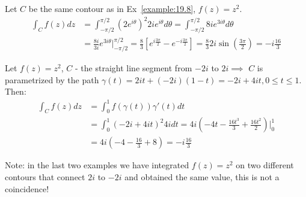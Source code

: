 \begin{example}\label{example:19.9} Let $C$ be the same contour as in Ex~\ref{example:19.8}, $f(z) = z^2$.
    \begin{align*}
 \int_C f(z) dz & = \int_{-\pi/2}^{\pi/2} (2e^{i\theta})^2 2ie^{i\theta} d\theta = \int_{-\pi/2}^{\pi/2} 8i e^{3i\theta} d\theta \\ 
 & = \frac{8i}{3i} e^{3i\theta} |_{-\pi/2}^{\pi/2} = \frac{8}{3} [e^{i\frac{3\pi}{2}} - e^{-i\frac{3\pi}{2}}] = \frac{8}{3} 2i \sin(\frac{3\pi}{2}) = -i\frac{16}{3}
    \end{align*}
\end{example}

\begin{example} \label{example:19.10} 
    Let $f(z) = z^2$, $C$ - the straight line segment from $-2i$ to $2i \implies$
    $C$ is parametrized by the path $\gamma(t) = 2it + (-2i)(1-t) = -2i + 4it, 0 \leq t \leq 1$. Then:
\begin{align*} 
    \int_C f(z) dz & = \int_0^1 f(\gamma(t)) \gamma'(t) dt \\ 
    & = \int_0^1 (-2i + 4it)^2 4i dt = 4i(-4t - \frac{16t^3}{3} + \frac{16t^2}{2})|_0^1 \\ 
    & = 4i(-4 - \frac{16}{3} + 8) = -i\frac{16}{3} 
\end{align*}
\end{example}

Note: in the last two examples we have integrated $f(z) = z^2$ on two different 
contours that connect $2i$ to $-2i$ and obtained the same value, this is not a coincidence!

